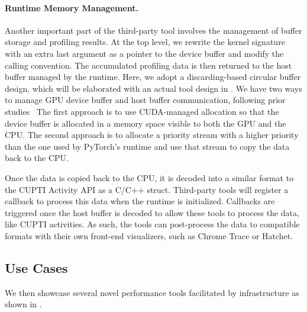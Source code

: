 \paragraph{Runtime Memory Management.}
Another important part of the third-party tool involves the management of buffer storage and profiling results.
At the top level, we rewrite the kernel signature with an extra last argument as a pointer to the device buffer and modify the calling convention.
The accumulated profiling data is then returned to the host buffer managed by the \thiswork{} runtime.
Here, we adopt a discarding-based circular buffer design, which will be elaborated with an actual tool design in \Sec{\ref{sec:profiler:memory}}.
We have two ways to manage GPU device buffer and host buffer communication, following prior studies~\cite{9355258,zhou2022valueexpert}
The first approach is to use CUDA-managed allocation so that the device buffer is allocated in a memory space visible to both the GPU and the CPU. 
The second approach is to allocate a priority stream with a higher priority than the one used by PyTorch's runtime and use that stream to copy the data back to the CPU.

Once the data is copied back to the CPU, it is decoded into a similar format to the CUPTI Activity API as a C/C++ struct. 
Third-party tools will register a callback to process this data when the runtime is initialized. 
Callbacks are triggered once the host buffer is decoded to allow these tools to process the data, like CUPTI activities. 
As such, the tools can post-process the data to compatible formats with their own front-end visualizers, such as Chrome Trace\cite{chrome_trace} or Hatchet\cite{bhatele2019hatchet}.

\subsection{Use Cases} \label{sec:usecase}

We then showcase several novel performance tools facilitated by \thiswork{} infrastructure as shown in \Fig{\ref{fig:compiler_centric_example}}.

